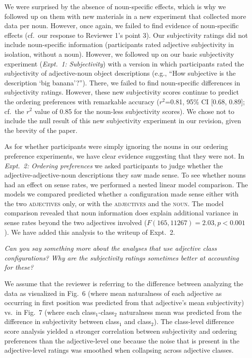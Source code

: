 \documentclass[12pt]{article}
\begin{document}
We were surprised by the absence of noun-specific effects, which is why we followed up on them with new materials in a new experiment that collected more data per noun. However, once again, we failed to find evidence of noun-specific effects (cf.~our response to Reviewer 1's point 3). Our subjectivity ratings did not include noun-specific information (participants rated adjective subjectivity in isolation, without a noun). However, we followed up on our basic subjectivity experiment (\emph{Expt.~1: Subjectivity}) with a version in which participants rated the subjectivity of adjective-noun object descriptions (e.g., ``How subjective is the description `big banana'?''). There, we failed to find noun-specific differences in subjectivity ratings. However, these new subjectivity scores continue to predict the ordering preferences with remarkable accuracy ($r^2${=}0.81, 95\% CI [0.68,  0.89]; cf.~the $r^2$ value of 0.85 for the noun-less subjectivity scores). We chose not to include the null result of this new subjectivity experiment in our revision, given the brevity of the paper.

As for whether participants were simply ignoring the nouns in our ordering preference experiments, we have clear evidence suggesting that they were not. In \emph{Expt.~2: Ordering preferences} we asked participants to judge whether the adjective-adjective-noun descriptions they saw made sense. To see whether nouns had an effect on sense rates, we performed a nested linear model comparison. The models we compared predicted whether a configuration made sense either with the two \textsc{adjectives} only, or with the \textsc{adjectives} and the \textsc{noun}. The model comparison revealed that noun information does explain additional variance in sense rates beyond the two adjectives involved ($F(165,11267)=2.03, p<0.001$). We have added this analysis to the writeup of Expt.~2.


\item \emph{Can you say something more about the analyses that use adjective class configurations? Why are the subjectivity ratings sometimes better at accounting for these?}

We assume that the reviewer is referring to the difference between analyzing the data as visualized in Fig.~6 (where mean naturalness of each adjective as occurring in first position was predicted from that adjective's mean subjectivity) vs.~in Fig.~7 (where each class$_1$-class$_2$ naturalness mean was predicted from the difference in subjectivity between class$_1$ and class$_2$). The class-level difference score analysis yielded a stronger correlation between subjectivity and ordering preferences than the adjective-level one because the noise that is present in the adjective-level ratings was smoothed when collapsing across adjective classes. 
\end{document}
